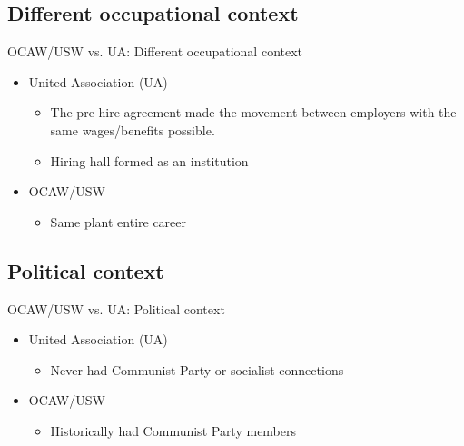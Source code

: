\documentclass{beamer}
\begin{document}
\subsection{Different occupational context}
\begin{frame}{OCAW/USW vs. UA: Different occupational context}
	\begin{itemize}
		\item United Association (UA)
		\begin{itemize}
			\item The pre-hire agreement made the movement between employers with the same wages/benefits possible.
			\item Hiring hall formed as an institution
		\end{itemize}
		\item OCAW/USW
			\begin{itemize}
				\item Same plant entire career
			\end{itemize}
	\end{itemize}
\end{frame}


\subsection{Political context}
\begin{frame}{OCAW/USW vs. UA: Political context}
	\begin{itemize}
		\item United Association (UA)
		\begin{itemize}
			\item Never had Communist Party or socialist connections
		\end{itemize}
		\item OCAW/USW
			\begin{itemize}
				\item Historically had Communist Party members
			\end{itemize}
	\end{itemize}
\end{frame}
\end{document}
